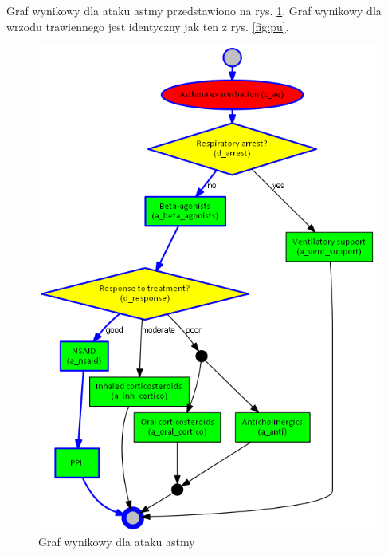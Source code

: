 Graf wynikowy dla ataku astmy przedstawiono na rys. \ref{fig:rozw_ae}. Graf wynikowy dla wrzodu trawiennego jest identyczny jak ten z rys. \ref{fig:pu}.
\begin{figure}[H]
\centering
\includegraphics[scale=0.5]{img/rozwiazanie1asthma.png}
\caption{Graf wynikowy dla ataku astmy}
\label{fig:rozw_ae}
\end{figure}
\newpage

